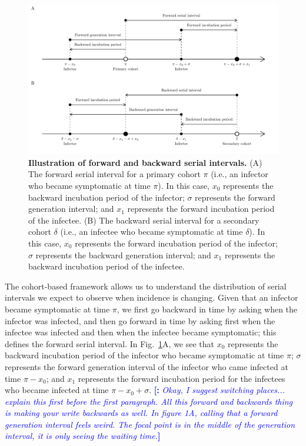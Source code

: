 \documentclass[12pt]{article}
\newcommand{\comment}{\showcomment}
\newcommand{\showcomment}[3]{\textcolor{#1}{\textbf{[#2: }\textsl{#3}\textbf{]}}}
\newcommand{\mli}[1]{\comment{blue}{}{#1}}
\newcommand{\fref}[1]{Fig.~\ref{fig:#1}}
\begin{document}
\begin{figure}[!th]
\includegraphics[width=\textwidth]{serial_guide.pdf}
\caption{
\textbf{Illustration of forward and backward serial intervals.}
(A) The forward serial interval for a primary cohort $\pi$ (i.e., an infector who became symptomatic at time $\pi$).
In this case, $x_0$ represents the backward incubation period of the infector;
$\sigma$ represents the forward generation interval;
and $x_1$ represents the forward incubation period of the infectee.
(B) The backward serial interval for a secondary cohort $\delta$ (i.e., an infectee who became symptomatic at time $\delta$).
In this case, $x_0$ represents the forward incubation period of the infector;
$\sigma$ represents the backward generation interval;
and $x_1$ represents the backward incubation period of the infectee.
}
\label{fig:diagram}
\end{figure}

The cohort-based framework allows us to understand the distribution of serial intervals we expect to observe when incidence is changing.
Given that an infector became symptomatic at time $\pi$, we first go backward in time by asking when the infector was infected, and then go forward in time by asking first when the infectee was infected and then when the infectee became symptomatic;
this defines the forward serial interval.
In \fref{diagram}A, we see that $x_0$ represents the backward incubation period of the infector who became symptomatic at time $\pi$;
$\sigma$ represents the forward generation interval of the infector who came infected at time $\pi - x_0$;
and $x_1$ represents the forward incubation period for the infectees who became infected at time $\pi - x_0 + \sigma$.
\mli{Okay, I suggest switching places... explain this first before the first paragraph. All this forward and backwards thing is making your write backwards as well. In figure 1A, calling that a forward generation interval feels weird. The focal point is in the middle of the generation interval, it is only seeing the waiting time.}
\end{document}
